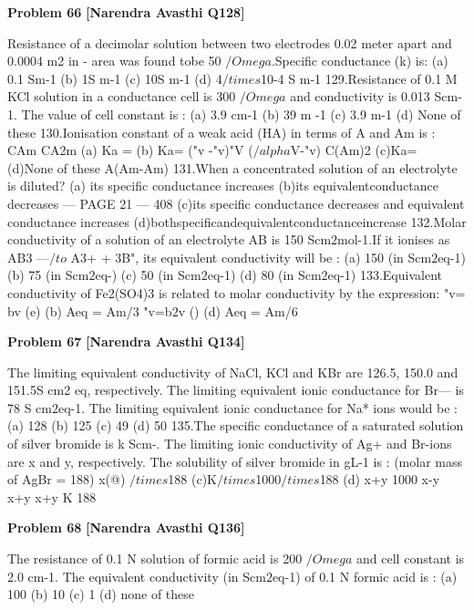 \begin{problembox}
\textbf{Problem 66} \hfill \textbf{[Narendra Avasthi Q128]}
\label{q:ext-narendra_avasthi_all_questions-66}

Resistance of a decimolar solution between two electrodes 0.02 meter apart and 0.0004 m2 in -
area was found tobe 50 $/Omega$.Specific conductance (k) is:
(a) 0.1 Sm-1
(b) 1S m-1
(c) 10S m-1
(d) 4$/times$10-4 S m-1
129.Resistance of 0.1 M KCl solution in a conductance cell is 300 $/Omega$ and conductivity is
0.013 Scm-1. The value of cell constant is :
(a) 3.9 cm-1
(b) 39 m -1
(c) 3.9 m-1
(d) None of these
130.Ionisation constant of a weak acid (HA) in terms of A and Am is :
CAm
CA2m
(a) Ka =
(b) Ka=
("v -"v)"V
($/alpha$V-"v)
C(Am)2
(c)Ka=
(d)None of these
A(Am-Am)
131.When a concentrated solution of an electrolyte is diluted?
(a) its specific conductance increases
(b)its equivalentconductance decreases
--- PAGE 21 ---
408
(c)its specific conductance decreases and equivalent conductance increases
(d)bothspecificandequivalentconductanceincrease
132.Molar conductivity of a solution of an electrolyte AB is 150 Scm$2$mol-1.If it ionises as
AB3 ---$/to$ A3+ + 3B", its equivalent conductivity will be :
(a) 150 (in Scm$2$eq-1)
(b) 75 (in Scm$2$eq-)
(c) 50 (in Scm$2$eq-1)
(d) 80 (in Scm$2$eq-1)
133.Equivalent conductivity of Fe2(SO4)3 is related to molar conductivity by the expression:
"v= bv (e)
(b) Aeq = Am/3
"v=b$2$v ()
(d) Aeq = Am/6
\end{problembox}

\begin{problembox}
\textbf{Problem 67} \hfill \textbf{[Narendra Avasthi Q134]}
\label{q:ext-narendra_avasthi_all_questions-67}

The limiting equivalent conductivity of NaCl, KCl and KBr are 126.5, 150.0 and 151.5S cm2
eq, respectively. The limiting equivalent ionic conductance for Br--- is 78 S cm$2$eq-1. The
limiting equivalent ionic conductance for Na* ions would be :
(a) 128
(b) 125
(c) 49
(d) 50
135.The specific conductance of a saturated solution of silver bromide is k Scm-. The limiting
ionic conductivity of Ag+ and Br-ions are x and y, respectively. The solubility of silver
bromide in gL-1 is : (molar mass of AgBr = 188)
x(@)
$/times$188
(c)K$/times$1000$/times$188
(d)
x+y
1000
x-y
x+y
x+y
K
188
\end{problembox}

\begin{problembox}
\textbf{Problem 68} \hfill \textbf{[Narendra Avasthi Q136]}
\label{q:ext-narendra_avasthi_all_questions-68}

The resistance of 0.1 N solution of formic acid is 200 $/Omega$ and cell constant is 2.0 cm-1. The
equivalent conductivity (in Scm$2$eq-1) of 0.1 N formic acid is :
(a) 100
(b) 10
(c) 1
(d) none of these
\end{problembox}

